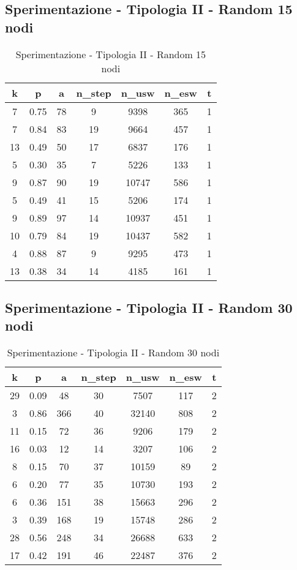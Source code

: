 \subsection{Sperimentazione - Tipologia II - Random 15 nodi}

\begin{table}[H]
\centering
\begin{tabular}{|c|c|c|c|c|c|c|}
\hline
\textbf{k} & \textbf{p} & \textbf{a} & \textbf{n\_step} & \textbf{n\_usw} & \textbf{n\_esw} & \textbf{t} \\ \hline
7 & 0.75 & 78 & 9 & 9398 & 365 & 1 \\ \hline
7 & 0.84 & 83 & 19 & 9664 & 457 & 1 \\ \hline
13 & 0.49 & 50 & 17 & 6837 & 176 & 1 \\ \hline
5 & 0.30 & 35 & 7 & 5226 & 133 & 1 \\ \hline
9 & 0.87 & 90 & 19 & 10747 & 586 & 1 \\ \hline
5 & 0.49 & 41 & 15 & 5206 & 174 & 1 \\ \hline
9 & 0.89 & 97 & 14 & 10937 & 451 & 1 \\ \hline
10 & 0.79 & 84 & 19 & 10437 & 582 & 1 \\ \hline
4 & 0.88 & 87 & 9 & 9295 & 473 & 1 \\ \hline
13 & 0.38 & 34 & 14 & 4185 & 161 & 1 \\ \hline
\end{tabular}
\caption{Sperimentazione - Tipologia II - Random 15 nodi}
\label{tab:sperimentazione-tipo1-15nodi}
\end{table}

\subsection{Sperimentazione - Tipologia II - Random 30 nodi}

\begin{table}[H]
\centering
\begin{tabular}{|c|c|c|c|c|c|c|}
\hline
\textbf{k} & \textbf{p} & \textbf{a} & \textbf{n\_step} & \textbf{n\_usw} & \textbf{n\_esw} & \textbf{t} \\ \hline
29 & 0.09 & 48 & 30 & 7507 & 117 & 2 \\ \hline
3 & 0.86 & 366 & 40 & 32140 & 808 & 2 \\ \hline
11 & 0.15 & 72 & 36 & 9206 & 179 & 2 \\ \hline
16 & 0.03 & 12 & 14 & 3207 & 106 & 2 \\ \hline
8 & 0.15 & 70 & 37 & 10159 & 89 & 2 \\ \hline
6 & 0.20 & 77 & 35 & 10730 & 193 & 2 \\ \hline
6 & 0.36 & 151 & 38 & 15663 & 296 & 2 \\ \hline
3 & 0.39 & 168 & 19 & 15748 & 286 & 2 \\ \hline
28 & 0.56 & 248 & 34 & 26688 & 633 & 2 \\ \hline
17 & 0.42 & 191 & 46 & 22487 & 376 & 2 \\ \hline
\end{tabular}
\caption{Sperimentazione - Tipologia II - Random 30 nodi}
\label{tab:sperimentazione-tipo1-30nodi}
\end{table}

